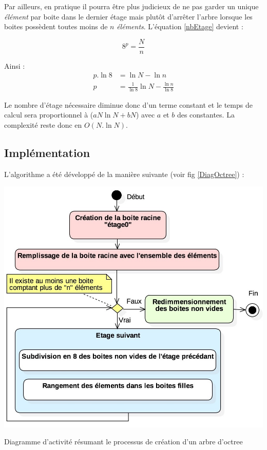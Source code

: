 Par ailleurs, en pratique il pourra être plus judicieux de ne pas garder un unique \textit{élément} par boite dans le dernier étage mais plutôt d'arrêter l'arbre lorsque les boites possèdent toutes moins de $n$ \textit{éléments}. L'équation \ref{nbEtage} devient :

\begin{equation} 
8^p = \frac{N}{n}
\end{equation}

Ainsi :
\begin{align}
p.\ln{8} &= \ln{N} -  \ln{n} \\
p &= \frac{1}{\ln{8}}\ln{N} -  \frac{\ln{n}}{\ln{8}}
\end{align}

Le nombre d'étage nécessaire diminue donc d'un terme constant et le temps de calcul sera proportionnel à ($aN\ln{N} + bN$) avec $a$ et $b$ des constantes. La complexité reste donc en $O(N.\ln{N})$.

\subsection{Implémentation}
L'algorithme a été développé de la manière suivante (voir fig \ref{DiagOctree}) :

\begin{figureth}
	\includegraphics[width=0.7\linewidth]{images/DiagOctree}
	\caption{Diagramme d'activité résumant le processus de création d'un arbre d'octree}
	\label{DiagOctree}
\end{figureth}

